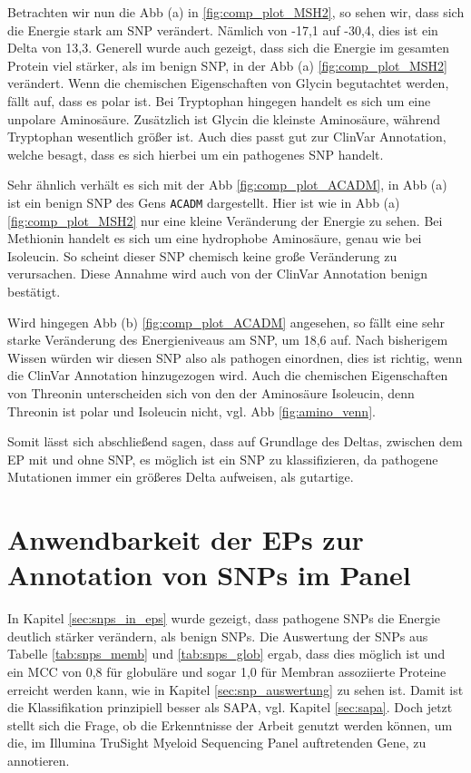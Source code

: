 Betrachten wir nun die \ac{Abb} (a) in \ref{fig:comp_plot_MSH2}, so sehen wir, dass sich die Energie stark am \ac{SNP} verändert. Nämlich von -17,1 auf -30,4, dies ist ein Delta von 13,3. Generell wurde auch gezeigt, dass sich die Energie im gesamten Protein viel stärker, als im benign \ac{SNP}, in der \ac{Abb} (a) \ref{fig:comp_plot_MSH2} verändert. Wenn die chemischen Eigenschaften von Glycin begutachtet werden, fällt auf, dass es polar ist. Bei Tryptophan hingegen handelt es sich um eine unpolare Aminosäure. Zusätzlich ist Glycin die kleinste Aminosäure, während Tryptophan wesentlich größer ist. Auch dies passt gut zur ClinVar Annotation, welche besagt, dass es sich hierbei um ein pathogenes \ac{SNP} handelt.

Sehr ähnlich verhält es sich mit der \ac{Abb} \ref{fig:comp_plot_ACADM}, in \ac{Abb} (a) ist ein benign \ac{SNP} des Gens \texttt{ACADM} dargestellt. Hier ist wie in \ac{Abb} (a) \ref{fig:comp_plot_MSH2} nur eine kleine Veränderung der Energie zu sehen. Bei Methionin handelt es sich um eine hydrophobe Aminosäure, genau wie bei Isoleucin. So scheint dieser \ac{SNP} chemisch keine große Veränderung zu verursachen. Diese Annahme wird auch von der ClinVar Annotation benign bestätigt. 

Wird hingegen \ac{Abb} (b) \ref{fig:comp_plot_ACADM} angesehen, so fällt eine sehr starke Veränderung des Energieniveaus am \ac{SNP}, um 18,6 auf. Nach bisherigem Wissen würden wir diesen \ac{SNP} also als pathogen einordnen, dies ist richtig, wenn die ClinVar Annotation hinzugezogen wird. Auch die chemischen Eigenschaften von Threonin unterscheiden sich von den der Aminosäure Isoleucin, denn Threonin ist polar und Isoleucin nicht, vgl. \ac{Abb} \ref{fig:amino_venn}. 

Somit lässt sich abschließend sagen, dass auf Grundlage des Deltas, zwischen dem \ac{EP} mit und ohne \ac{SNP}, es möglich ist ein \ac{SNP} zu klassifizieren, da pathogene Mutationen immer ein größeres Delta aufweisen, als gutartige.


\section{Anwendbarkeit der EPs zur Annotation von SNPs im Panel}

In Kapitel \ref{sec:snps_in_eps} wurde gezeigt, dass pathogene \ac{SNP}s die Energie deutlich stärker verändern, als benign \ac{SNP}s.  Die Auswertung der \ac{SNP}s aus Tabelle \ref{tab:snps_memb} und \ref{tab:snps_glob} ergab, dass dies möglich ist und ein MCC von 0,8 für globuläre und sogar 1,0 für Membran assoziierte Proteine erreicht werden kann, wie in Kapitel \ref{sec:snp_auswertung} zu sehen ist. Damit ist die Klassifikation prinzipiell besser als SAPA, vgl. Kapitel \ref{sec:sapa}. Doch jetzt stellt sich die Frage, ob die Erkenntnisse der Arbeit genutzt werden können, um die, im Illumina TruSight Myeloid Sequencing Panel auftretenden Gene, zu annotieren. 

